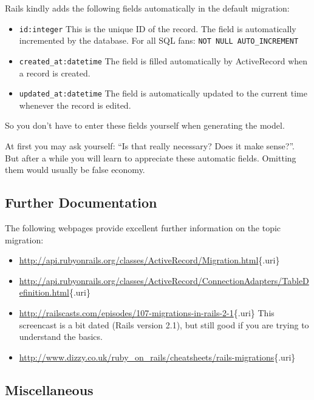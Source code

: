 \documentclass[a4paper]{book}
\newcounter{tab}[chapter]
\begin{document}
Rails kindly adds the following fields automatically in the default migration:

\begin{itemize}
\itemsep1pt\parskip0pt
\item
  \texttt{id:integer} This is the unique ID of the record. The field is automatically incremented by the database. For all SQL fans: \texttt{NOT NULL AUTO\_INCREMENT}
\item
  \texttt{created\_at:datetime} The field is filled automatically by ActiveRecord when a record is created.
\item
  \texttt{updated\_at:datetime} The field is automatically updated to the current time whenever the record is edited.
\end{itemize}

So you don't have to enter these fields yourself when generating the model.

At first you may ask yourself: “Is that really necessary? Does it make sense?”. But after a while you will learn to appreciate these automatic fields. Omitting them would usually be false economy.

\subsection{Further Documentation}\label{further-documentation-1}

The following webpages provide excellent further information on the topic migration:

\begin{itemize}
\itemsep1pt\parskip0pt
\item
  \url{http://api.rubyonrails.org/classes/ActiveRecord/Migration.html}\{.uri\}
\item
  \url{http://api.rubyonrails.org/classes/ActiveRecord/ConnectionAdapters/TableDefinition.html}\{.uri\}
\item
  \url{http://railscasts.com/episodes/107-migrations-in-rails-2-1}\{.uri\} This screencast is a bit dated (Rails version 2.1), but still good if you are trying to understand the basics.
\item
  \url{http://www.dizzy.co.uk/ruby_on_rails/cheatsheets/rails-migrations}\{.uri\}
\end{itemize}

\subsection{Miscellaneous}\label{miscellaneous-2}
\end{document}
